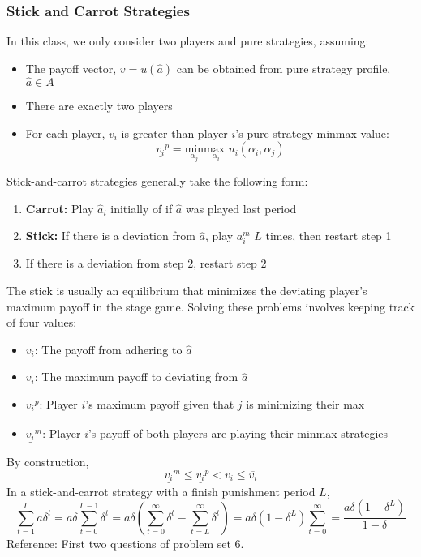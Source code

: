 \documentclass{article}
\newcommand{\red}[1]{{\color{red}#1}}
\begin{document}
\subsubsection{Stick and Carrot Strategies}
In this class, we only consider two players and pure strategies, assuming:
\begin{itemize}
	\item The payoff vector, ${v=u(\hat{a})}$ can be obtained from pure strategy profile, ${\hat{a}\in A}$
	\item There are exactly two players 
	\item For each player, $v_i$ is greater than player $i$'s pure strategy minmax value:	
		\[
			\underline{v_i}^p = \underset{\alpha_{j}}{\text{min}}\underset{\alpha_i}{\text{max }}u_i(\alpha_i,\alpha_j)
		\]
\end{itemize}
Stick-and-carrot strategies generally take the following form:
\begin{enumerate}
	\item \textbf{Carrot:} Play $\hat{a}_i$ initially of if $\hat{a}$ was played last period
	\item \textbf{Stick:} If there is a deviation from $\hat{a}$, play $a_i^m$ $L$ times, then restart step 1
	\item If there is a deviation from step 2, restart step 2
\end{enumerate}
The stick is usually an equilibrium that minimizes the deviating player's maximum payoff in the stage game. Solving these problems involves keeping track of four values:
\begin{itemize}
	\item $v_i$: The payoff from adhering to $\hat{a}$
	\item $\overline{v_i}$: The maximum payoff to deviating from $\hat{a}$
	\item $\underline{v_i}^p$: Player $i$'s maximum payoff given that $j$ is minimizing their max
	\item $\underline{v_i}^m$: Player $i$'s payoff of both players are playing their minmax strategies
\end{itemize}
By construction, 
\[
	\underline{v_i}^m\leq \underline{v_i}^p < v_i \leq \overline{v_i}
\]
In a stick-and-carrot strategy with a finish punishment period $L$,
 \[
	\sum_{t=1}^L a\delta^t = a\delta\sum_{t=0}^{L-1}\delta^t = a\delta\left(\sum_{t=0}^\infty\delta^t-\sum_{t=L}^\infty\delta^t\right) = a\delta(1-\delta^L)\sum_{t=0}^\infty= \frac{a\delta(1-\delta^L)}{1-\delta}
 \]
\red{Reference: First two questions of problem set 6.}
 
\end{document}
